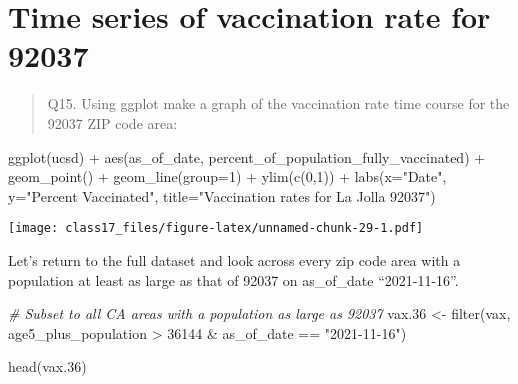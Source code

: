 \documentclass[
]{article}
\newenvironment{Shaded}{\begin{snugshade}}{\end{snugshade}}
\newcommand{\AttributeTok}[1]{\textcolor[rgb]{0.77,0.63,0.00}{#1}}
\newcommand{\CommentTok}[1]{\textcolor[rgb]{0.56,0.35,0.01}{\textit{#1}}}
\newcommand{\DecValTok}[1]{\textcolor[rgb]{0.00,0.00,0.81}{#1}}
\newcommand{\FloatTok}[1]{\textcolor[rgb]{0.00,0.00,0.81}{#1}}
\newcommand{\FunctionTok}[1]{\textcolor[rgb]{0.00,0.00,0.00}{#1}}
\newcommand{\NormalTok}[1]{#1}
\newcommand{\OtherTok}[1]{\textcolor[rgb]{0.56,0.35,0.01}{#1}}
\newcommand{\SpecialCharTok}[1]{\textcolor[rgb]{0.00,0.00,0.00}{#1}}
\newcommand{\StringTok}[1]{\textcolor[rgb]{0.31,0.60,0.02}{#1}}
\begin{document}
\hypertarget{time-series-of-vaccination-rate-for-92037}{%
\section{Time series of vaccination rate for
92037}\label{time-series-of-vaccination-rate-for-92037}}

\begin{quote}
Q15. Using ggplot make a graph of the vaccination rate time course for
the 92037 ZIP code area:
\end{quote}

\begin{Shaded}
\begin{Highlighting}[]
\FunctionTok{ggplot}\NormalTok{(ucsd) }\SpecialCharTok{+}
  \FunctionTok{aes}\NormalTok{(as\_of\_date,}
\NormalTok{      percent\_of\_population\_fully\_vaccinated) }\SpecialCharTok{+}
  \FunctionTok{geom\_point}\NormalTok{() }\SpecialCharTok{+}
  \FunctionTok{geom\_line}\NormalTok{(}\AttributeTok{group=}\DecValTok{1}\NormalTok{) }\SpecialCharTok{+}
  \FunctionTok{ylim}\NormalTok{(}\FunctionTok{c}\NormalTok{(}\DecValTok{0}\NormalTok{,}\DecValTok{1}\NormalTok{)) }\SpecialCharTok{+}
  \FunctionTok{labs}\NormalTok{(}\AttributeTok{x=}\StringTok{"Date"}\NormalTok{, }\AttributeTok{y=}\StringTok{"Percent Vaccinated"}\NormalTok{, }\AttributeTok{title=}\StringTok{"Vaccination rates for La Jolla 92037"}\NormalTok{)}
\end{Highlighting}
\end{Shaded}

\texttt{[image: class17\_files/figure-latex/unnamed-chunk-29-1.pdf]}

Let's return to the full dataset and look across every zip code area
with a population at least as large as that of 92037 on as\_of\_date
``2021-11-16''.

\begin{Shaded}
\begin{Highlighting}[]
\CommentTok{\# Subset to all CA areas with a population as large as 92037}
\NormalTok{vax}\FloatTok{.36} \OtherTok{\textless{}{-}} \FunctionTok{filter}\NormalTok{(vax, age5\_plus\_population }\SpecialCharTok{\textgreater{}} \DecValTok{36144} \SpecialCharTok{\&}
\NormalTok{                as\_of\_date }\SpecialCharTok{==} \StringTok{"2021{-}11{-}16"}\NormalTok{)}

\FunctionTok{head}\NormalTok{(vax}\FloatTok{.36}\NormalTok{)}
\end{Highlighting}
\end{Shaded}
\end{document}
